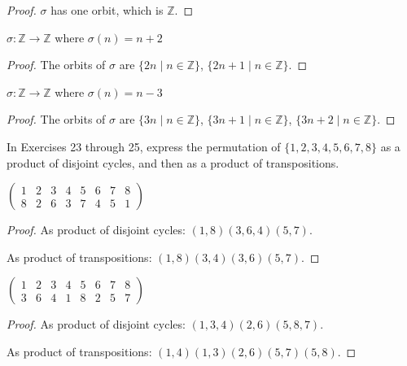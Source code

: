 \begin{proof}
    $\sigma$ has one orbit, which is $\mathbb{Z}$.
\end{proof}

\begin{exercise}
    $\sigma: \mathbb{Z} \to \mathbb{Z}$ where $\sigma(n) = n + 2$
\end{exercise}

\begin{proof}
    The orbits of $\sigma$ are $\{ 2n \mid n\in\mathbb{Z} \}$, $\{ 2n + 1 \mid n\in\mathbb{Z} \}$.
\end{proof}

\begin{exercise}
    $\sigma: \mathbb{Z} \to \mathbb{Z}$ where $\sigma(n) = n - 3$
\end{exercise}

\begin{proof}
    The orbits of $\sigma$ are $\{ 3n \mid n\in\mathbb{Z} \}$, $\{ 3n + 1 \mid n\in\mathbb{Z} \}$, $\{ 3n + 2 \mid n\in\mathbb{Z} \}$.
\end{proof}

In Exercises 23 through 25, express the permutation of $\{ 1, 2, 3, 4, 5, 6, 7, 8 \}$ as a product of disjoint cycles, and then as a product of transpositions.

\begin{exercise}
    $\begin{pmatrix}
            1 & 2 & 3 & 4 & 5 & 6 & 7 & 8 \\
            8 & 2 & 6 & 3 & 7 & 4 & 5 & 1
        \end{pmatrix}$
\end{exercise}

\begin{proof}
    As product of disjoint cycles: $(1, 8)(3, 6, 4)(5, 7)$.

    As product of transpositions: $(1, 8)(3, 4)(3, 6)(5, 7)$.
\end{proof}

\begin{exercise}
    $\begin{pmatrix}
            1 & 2 & 3 & 4 & 5 & 6 & 7 & 8 \\
            3 & 6 & 4 & 1 & 8 & 2 & 5 & 7
        \end{pmatrix}$
\end{exercise}

\begin{proof}
    As product of disjoint cycles: $(1, 3, 4)(2, 6)(5, 8, 7)$.

    As product of transpositions: $(1, 4)(1, 3)(2, 6)(5, 7)(5, 8)$.
\end{proof}


